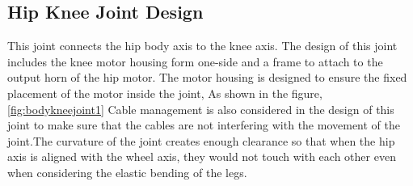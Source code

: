 \subsection{Hip Knee Joint Design}
This joint connects the hip body axis to the knee axis.
The design of this joint includes the knee motor housing form one-side and a frame to attach to the output horn of the hip motor.
The motor housing is designed to ensure the fixed placement of the motor inside the joint, As shown in the figure, \ref{fig:bodykneejoint1} Cable management is also considered in the design of this joint to make sure that the cables are not interfering with the movement of the joint.The curvature of the joint creates enough clearance so that when the hip axis is aligned with the wheel axis, they would not touch with each other even when considering the elastic bending of the legs.


